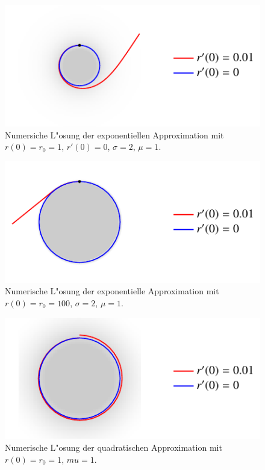 \begin{refsection}
\begin{figure}
  \centering
  \includegraphics[scale=1]{licht/standalone/fig_kreis_exp1.pdf} 
  \caption{Numersiche L"osung der exponentiellen Approximation mit $r(0) = r_0 = 1$, $r'(0) = 0$, $\sigma = 2$, $\mu = 1$. \label{fig:sphere_special1}}

\end{figure}

\begin{figure}
  \centering
  \includegraphics[scale=1]{licht/standalone/fig_kreis_exp2.pdf}
  \caption{Numerische L"osung der exponentielle Approximation mit $r(0) = r_0 = 100$, $\sigma = 2$, $\mu = 1$. \label{fig:sphere_special2}} 
  
\end{figure}

\begin{figure}
  \centering
  \includegraphics[scale=1]{licht/standalone/fig_kreis_square1.pdf}
  \caption{Numerische L"osung der quadratischen Approximation mit $r(0) = r_0 = 1$, $mu = 1$. \label{fig:sphere_special3} }
  

\end{figure}
\end{refsection}
